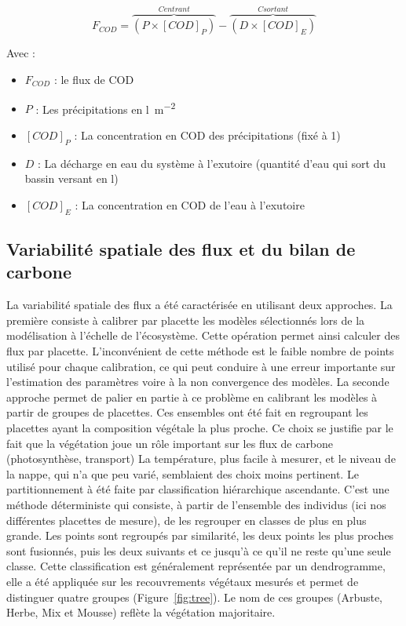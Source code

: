 \begin{equation}
\label{eq:COD}
F_{COD} = \overbrace{(P\times[COD]_{P})}^{C entrant}-\overbrace{(D\times[COD]_{E})}^{C sortant}
\end{equation}

Avec :
\begin{itemize}
\item $F_{COD}$ : le flux de COD
\item $P$ : Les précipitations en \si{\litre\per\square\metre}
\item $[COD]_{P}$ : La concentration en COD des précipitations (fixé à \SI{1}{\mgl})
\item $D$ : La décharge en eau du système à l'exutoire (quantité d'eau qui sort du bassin versant en \si{\litre})
\item $[COD]_{E}$ : La concentration en COD de l'eau à l'exutoire 
\end{itemize}

\subsection{Variabilité spatiale des flux et du bilan de carbone}

La variabilité spatiale des flux a été caractérisée en utilisant deux approches.
La première consiste à calibrer par placette les modèles sélectionnés lors de la modélisation à l'échelle de l'écosystème.
Cette opération permet ainsi calculer des flux par placette.
L'inconvénient de cette méthode est le faible nombre de points utilisé pour chaque calibration, ce qui peut conduire à une erreur importante sur l'estimation des paramètres voire à la non convergence des modèles.
La seconde approche permet de palier en partie à ce problème en calibrant les modèles à partir de groupes de placettes.
Ces ensembles ont été fait en regroupant les placettes ayant la composition végétale la plus proche.
Ce choix se justifie par le fait que la végétation joue un rôle important sur les flux de carbone (photosynthèse, transport)
La température, plus facile à mesurer, et le niveau de la nappe, qui n'a que peu varié, semblaient des choix moins pertinent. 
Le partitionnement à été faite par classification hiérarchique ascendante.
C'est une méthode déterministe qui consiste, à partir de l'ensemble des individus (ici nos différentes placettes de mesure), de les regrouper en classes de plus en plus grande.
Les points sont regroupés par similarité, les deux points les plus proches sont fusionnés, puis les deux suivants et ce jusqu'à ce qu'il ne reste qu'une seule classe.
Cette classification est généralement représentée par un dendrogramme, elle a été appliquée sur les recouvrements végétaux mesurés et permet de distinguer quatre groupes (Figure~\ref{fig:tree}).
Le nom de ces groupes (Arbuste, Herbe, Mix et Mousse) reflète la végétation majoritaire.

